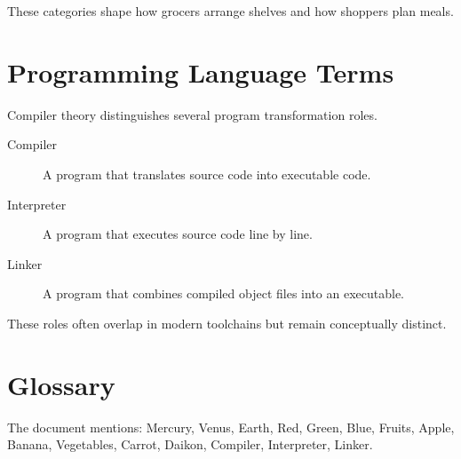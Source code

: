 \documentclass[12pt]{article}
\begin{document}
These categories shape how grocers arrange shelves and how shoppers plan meals.

\section{Programming Language Terms}

Compiler theory distinguishes several program transformation roles.

\begin{description}
\item[Compiler] A program that translates source code into executable code.
\item[Interpreter] A program that executes source code line by line.
\item[Linker] A program that combines compiled object files into an executable.
\end{description}

These roles often overlap in modern toolchains but remain conceptually distinct.

\section{Glossary}

The document mentions: Mercury, Venus, Earth, Red, Green, Blue, Fruits,
Apple, Banana, Vegetables, Carrot, Daikon, Compiler, Interpreter, Linker.
\end{document}

